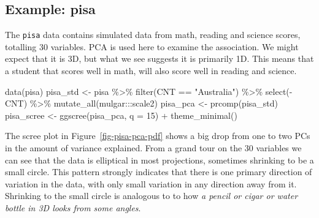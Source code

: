 \documentclass[
  letterpaper,
]{krantz}
\newenvironment{Shaded}{\begin{snugshade}}{\end{snugshade}}
\newcommand{\AttributeTok}[1]{\textcolor[rgb]{0.40,0.45,0.13}{#1}}
\newcommand{\DecValTok}[1]{\textcolor[rgb]{0.68,0.00,0.00}{#1}}
\newcommand{\FunctionTok}[1]{\textcolor[rgb]{0.28,0.35,0.67}{#1}}
\newcommand{\NormalTok}[1]{\textcolor[rgb]{0.00,0.23,0.31}{#1}}
\newcommand{\OtherTok}[1]{\textcolor[rgb]{0.00,0.23,0.31}{#1}}
\newcommand{\SpecialCharTok}[1]{\textcolor[rgb]{0.37,0.37,0.37}{#1}}
\newcommand{\StringTok}[1]{\textcolor[rgb]{0.13,0.47,0.30}{#1}}
\begin{document}
\subsection{Example: pisa}\label{example-pisa}


The \texttt{pisa} data contains simulated data from math, reading and
science scores, totalling 30 variables. PCA is used here to examine the
association. We might expect that it is 3D, but what we see suggests it
is primarily 1D. This means that a student that scores well in math,
will also score well in reading and science.

\begin{Shaded}
\begin{Highlighting}[]
\FunctionTok{data}\NormalTok{(pisa)}
\NormalTok{pisa\_std }\OtherTok{\textless{}{-}}\NormalTok{ pisa }\SpecialCharTok{\%\textgreater{}\%}
  \FunctionTok{filter}\NormalTok{(CNT }\SpecialCharTok{==} \StringTok{"Australia"}\NormalTok{) }\SpecialCharTok{\%\textgreater{}\%}
  \FunctionTok{select}\NormalTok{(}\SpecialCharTok{{-}}\NormalTok{CNT) }\SpecialCharTok{\%\textgreater{}\%}
  \FunctionTok{mutate\_all}\NormalTok{(mulgar}\SpecialCharTok{:::}\NormalTok{scale2)}
\NormalTok{pisa\_pca }\OtherTok{\textless{}{-}} \FunctionTok{prcomp}\NormalTok{(pisa\_std)}
\NormalTok{pisa\_scree }\OtherTok{\textless{}{-}} \FunctionTok{ggscree}\NormalTok{(pisa\_pca, }\AttributeTok{q =} \DecValTok{15}\NormalTok{) }\SpecialCharTok{+} \FunctionTok{theme\_minimal}\NormalTok{()}
\end{Highlighting}
\end{Shaded}

The scree plot in Figure~\ref{fig-pisa-pca-pdf} shows a big drop from
one to two PCs in the amount of variance explained. From a grand tour on
the 30 variables we can see that the data is elliptical in most
projections, sometimes shrinking to be a small circle. This pattern
strongly indicates that there is one primary direction of variation in
the data, with only small variation in any direction away from it.
Shrinking to the small circle is analogous to to how \emph{a pencil or
cigar or water bottle in 3D looks from some angles}.
\end{document}
